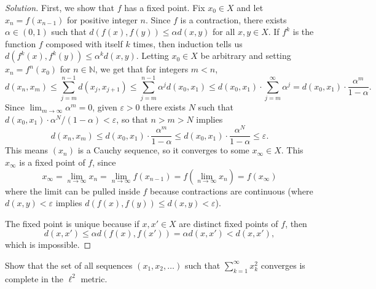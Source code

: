 \documentclass[10pt]{article}
\providecommand{\eps}{\varepsilon}
\providecommand{\NN}{\mathbb N}
\newenvironment{soln}{\begin{proof}[Solution]}{\end{proof}}
\begin{document}
\begin{soln}
    First, we show that $f$ has a fixed point.
    Fix $x_0\in X$ and let $x_n = f(x_{n-1})$ for positive integer $n$.
    Since $f$ is a contraction, there exists $\alpha \in (0,1)$ such that
    $d(f(x), f(y)) \le \alpha d(x,y)$ for all $x,y\in X$.
    If $f^k$ is the function $f$ composed with itself $k$ times, then
    induction tells us $d(f^k(x), f^k(y)) \le \alpha^k d(x,y)$.
    Letting $x_0\in X$ be arbitrary and setting $x_n = f^n(x_0)$ for $n\in\NN$,
    we get that for integers $m < n$,
    \begin{equation*}
	d(x_n, x_m) \le \sum_{j=m}^{n-1} d(x_j, x_{j+1})
	\le \sum_{j=m}^{n-1} \alpha^j d(x_0,x_1)
	\le d(x_0,x_1)\cdot \sum_{j=m}^\infty \alpha^j
	= d(x_0,x_1)\cdot \frac{\alpha^m}{1-\alpha}.
    \end{equation*}
    Since $\lim_{m\to\infty} \alpha^m = 0$,
    given $\eps > 0$ there exists $N$ such that
    $d(x_0,x_1)\cdot \alpha^N/(1-\alpha) < \eps$, so that
    $n > m > N$ implies
    \begin{equation*}
        d(x_n,x_m)
	\le d(x_0,x_1)\cdot \frac{\alpha^m}{1-\alpha}
	\le d(x_0,x_1)\cdot \frac{\alpha^N}{1-\alpha}
	\le \eps.
    \end{equation*}
    This means $(x_n)$ is a Cauchy sequence,
    so it converges to some $x_\infty\in X$.
    This $x_\infty$ is a fixed point of $f$, since
    \begin{equation*}
	x_\infty = \lim_{n\to\infty} x_n
	= \lim_{n\to\infty}f(x_{n-1})
	= f\left(\lim_{n\to\infty} x_n\right)
	= f(x_\infty)
    \end{equation*}
    where the limit can be pulled inside $f$ because
    contractions are continuous (where $d(x,y) < \eps$
    implies $d(f(x), f(y)) \le d(x,y) < \eps$).

    The fixed point is unique because
    if $x,x'\in X$ are distinct fixed points of $f$, then
    \begin{equation*}
        d(x,x') \le \alpha d(f(x),f(x')) = \alpha d(x,x') < d(x,x'),
    \end{equation*}
    which is impossible.
\end{soln}

\begin{problem}
    [Munkres 43.7]
    Show that the set of all sequences $(x_1,x_2,\dots)$
    such that $\sum_{k=1}^\infty x_k^2$ converges is complete in the $\ell^2$ metric.
\end{problem}
\end{document}
